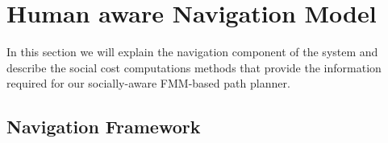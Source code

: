 \section{Human aware Navigation Model}
\label{social_nav}

In this section we will explain the navigation component of the system and describe the social cost computations methods that provide the information required for our socially-aware FMM-based path planner.



\subsection{Navigation Framework}

